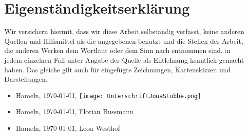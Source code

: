 \documentclass[a4paper,12pt,titlepage]{article}
\begin{document}
\part{Eigenständigkeitserklärung}
Wir versichern hiermit, dass wir diese Arbeit selbständig verfasst, keine anderen Quellen und Hilfsmittel
als die angegebenen benutzt und die Stellen der Arbeit, die anderen Werken dem Wortlaut oder dem Sinn nach entnommen sind,
in jedem einzelnen Fall unter Angabe der Quelle als Entlehnung kenntlich gemacht haben.
Das gleiche gilt auch für eingefügte Zeichnungen, Kartenskizzen und Darstellungen.
\begin{itemize}
\item Hameln, \today, \texttt{[image: UnterschriftJonaStubbe.png]}
\item Hameln, \today, Florian Bussmann
\item Hameln, \today, Leon Westhof
\end{itemize}
\end{document}
